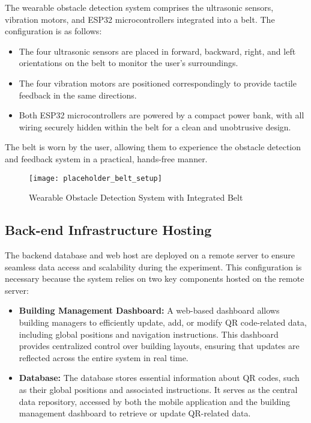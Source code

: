 The wearable obstacle detection system comprises the ultrasonic sensors, vibration motors, and ESP32 microcontrollers integrated into a belt. The configuration is as follows:

\begin{itemize}
	\item The four ultrasonic sensors are placed in forward, backward, right, and left orientations on the belt to monitor the user’s surroundings.
	\item The four vibration motors are positioned correspondingly to provide tactile feedback in the same directions.
	\item Both ESP32 microcontrollers are powered by a compact power bank, with all wiring securely hidden within the belt for a clean and unobtrusive design.
\end{itemize}

The belt is worn by the user, allowing them to experience the obstacle detection and feedback system in a practical, hands-free manner.

\begin{figure}[h]
	\centering
	\texttt{[image: placeholder\_belt\_setup]}
	\caption{Wearable Obstacle Detection System with Integrated Belt}
	\label{fig:belt_setup}
\end{figure}

\subsection{Back-end Infrastructure Hosting}

The backend database and web host are deployed on a remote server to ensure seamless data access and scalability during the experiment. This configuration is necessary because the system relies on two key components hosted on the remote server:

\begin{itemize}
	\item \textbf{Building Management Dashboard:} A web-based dashboard allows building managers to efficiently update, add, or modify QR code-related data, including global positions and navigation instructions. This dashboard provides centralized control over building layouts, ensuring that updates are reflected across the entire system in real time.
	\item \textbf{Database:} The database stores essential information about QR codes, such as their global positions and associated instructions. It serves as the central data repository, accessed by both the mobile application and the building management dashboard to retrieve or update QR-related data.
\end{itemize}

